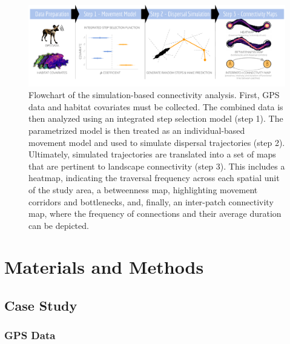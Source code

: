 \documentclass[../FinalThesis.tex]{subfiles}
\begin{document}
\begin{figure}[htbp]
  \begin{center}
    \includegraphics[width = \textwidth]{Figures/GraphicalAbstract}
    \caption{Flowchart of the simulation-based connectivity analysis. First, GPS
    data and habitat covariates must be collected. The combined data is then
    analyzed using an integrated step selection model (step 1). The parametrized
    model is then treated as an individual-based movement model and used to
    simulate dispersal trajectories (step 2). Ultimately, simulated trajectories
    are translated into a set of maps that are pertinent to landscape
    connectivity (step 3). This includes a heatmap, indicating the traversal
    frequency across each spatial unit of the study area, a betweenness map,
    highlighting movement corridors and bottlenecks, and, finally, an
    inter-patch connectivity map, where the frequency of connections and their
    average duration can be depicted.}
    \label{GraphicalAbstract}
  \end{center}
\end{figure}

\section{Materials and Methods}
\subsection{Case Study}
\subsubsection{GPS Data}
\end{document}
